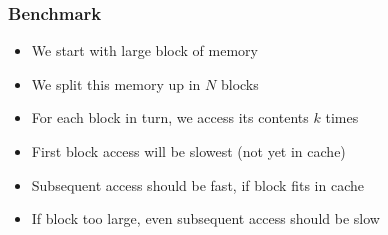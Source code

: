 \begin{frame}
  \frametitle{Benchmark}
  \begin{itemize}
    \item We start with large block of memory
    \item We split this memory up in $N$ blocks
    \item For each block in turn, we access its contents $k$ times
  \end{itemize}
  \vskip5mm
  \begin{itemize}
    \item First block access will be slowest (not yet in cache)
    \item Subsequent access should be fast, if block fits in cache
    \item If block too large, even subsequent access should be slow
  \end{itemize}
\end{frame}

